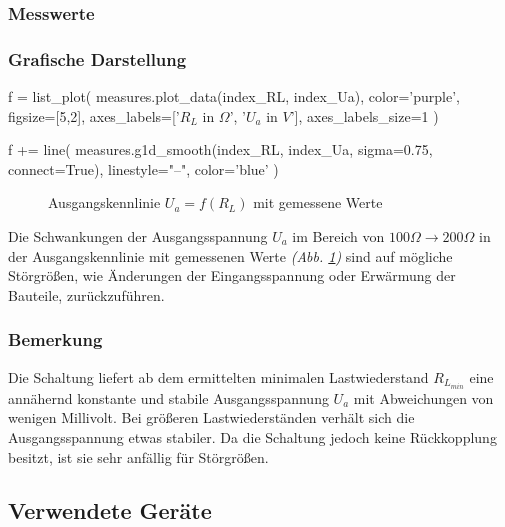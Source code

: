 \documentclass[a4paper]{hitec}
\begin{document}
\subsubsection{Messwerte}

\begin{center}
    \renewcommand{\arraystretch}{1.2}
\end{center}

\subsubsection{Grafische Darstellung}

\begin{sagesilent}
    f = list_plot(
        measures.plot_data(index_RL, index_Ua),
        color='purple',
        figsize=[5,2],
        axes_labels=['$R_L$ in $\Omega$', '$U_a$ in $V$'],
        axes_labels_size=1
    )

    f += line(
        measures.g1d_smooth(index_RL, index_Ua, sigma=0.75, connect=True),
        linestyle="--",
        color='blue'
    )
\end{sagesilent}

\begin{figure}[H]
    \centering
    \caption{Ausgangskennlinie \textbf{$U_{a} = f(R_L)$} mit gemessene Werte}
    \label{fig:measure1}
\end{figure}

Die Schwankungen der Ausgangsspannung $U_{a}$ im Bereich von $100\Omega \to 200\Omega$ in der Ausgangskennlinie mit gemessenen Werte \textit{(Abb. \ref{fig:measure1})} sind auf mögliche Störgrößen, wie Änderungen der Eingangsspannung oder Erwärmung der Bauteile, zurückzuführen.

\subsubsection{Bemerkung}

Die Schaltung liefert ab dem ermittelten minimalen Lastwiederstand $R_{L_{min}}$ eine annähernd konstante und stabile Ausgangsspannung $U_{a}$ mit Abweichungen von wenigen Millivolt.
Bei größeren Lastwiederständen verhält sich die Ausgangsspannung etwas stabiler.
Da die Schaltung jedoch keine Rückkopplung besitzt, ist sie sehr anfällig für Störgrößen.

\clearpage

\subsection{Verwendete Geräte}
\end{document}
